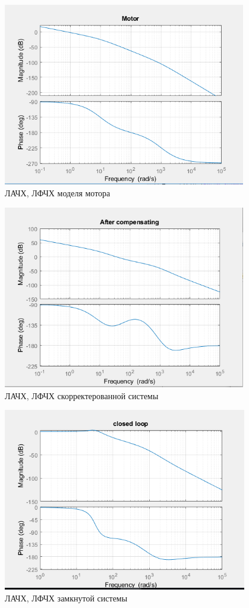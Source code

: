 \documentclass[a4paper,12pt]{article}
\begin{document}
\begin{figure}[h]
    \centering
    \includegraphics[height=8cm]{img/f1.PNG}
    \caption{ЛАЧХ, ЛФЧХ моделя мотора}
    \label{fig:my_label}
\end{figure}

\begin{figure}[h]
    \centering
    \includegraphics[height=8cm]{img/f2.PNG}
    \caption{ЛАЧХ, ЛФЧХ скорректерованной системы}
    \label{fig:1}
\end{figure}

\begin{figure}[h]
    \centering
    \includegraphics[height=8cm]{img/f3.PNG}
    \caption{ЛАЧХ, ЛФЧХ замкнутой системы}
    \label{fig:23}
\end{figure}
\end{document}
